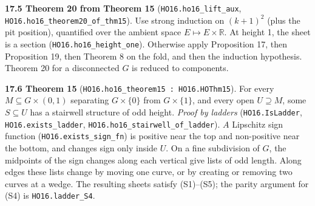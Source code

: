 \documentclass[11pt]{article}
\newcommand{\lean}[1]{\texttt{#1}}
\begin{document}
\textbf{17.5 Theorem 20 from Theorem 15} (\lean{HO16.\hspace{0pt}ho16\_\hspace{0pt}lift\_\hspace{0pt}aux}, \lean{HO16.\hspace{0pt}ho16\_\hspace{0pt}theorem20\_\hspace{0pt}of\_\hspace{0pt}thm15}). Use strong induction on $(k + 1)^2$ (plus the pit position), quantified over the ambient space $E \mapsto E \times \mathbb{R}$. At height 1, the sheet is a section (\lean{HO16.\hspace{0pt}ho16\_\hspace{0pt}height\_\hspace{0pt}one}). Otherwise apply Proposition 17, then Proposition 19, then Theorem 8 on the fold, and then the induction hypothesis. Theorem 20 for a disconnected $G$ is reduced to components.

\textbf{17.6 Theorem 15} (\lean{HO16.\hspace{0pt}ho16\_\hspace{0pt}theorem15 : HO16.\hspace{0pt}HOThm15}). For every $M \subseteq G \times (0, 1)$ separating $G \times \{0\}$ from $G \times \{1\}$, and every open $U \supseteq M$, some $S \subseteq U$ has a stairwell structure of odd height. \emph{Proof by ladders} (\lean{HO16.\hspace{0pt}IsLadder}, \lean{HO16.\hspace{0pt}exists\_\hspace{0pt}ladder}, \lean{HO16.\hspace{0pt}ho16\_\hspace{0pt}stairwell\_\hspace{0pt}of\_\hspace{0pt}ladder}). $A$ Lipschitz sign function (\lean{HO16.\hspace{0pt}exists\_\hspace{0pt}sign\_\hspace{0pt}fn}) is positive near the top and non-positive near the bottom, and changes sign only inside $U$. On a fine subdivision of $G$, the midpoints of the sign changes along each vertical give lists of odd length. Along edges these lists change by moving one curve, or by creating or removing two curves at a wedge. The resulting sheets satisfy (S1)--(S5); the parity argument for (S4) is \lean{HO16.\hspace{0pt}ladder\_\hspace{0pt}S4}.
\end{document}
